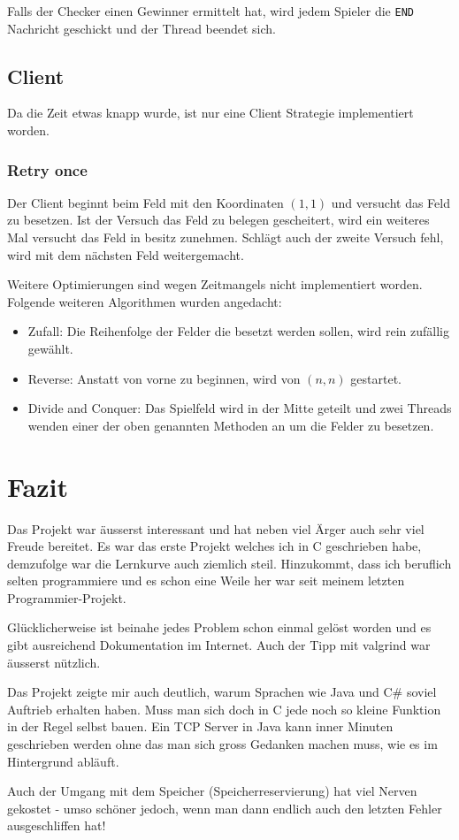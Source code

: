 Falls der Checker einen Gewinner ermittelt hat, wird jedem Spieler die \texttt{END} Nachricht geschickt und der Thread beendet sich.  

\section{Client}
Da die Zeit etwas knapp wurde, ist nur eine Client Strategie implementiert worden.

\subsection{Retry once}
Der Client beginnt beim Feld mit den Koordinaten $(1, 1)$ und versucht das Feld zu besetzen. Ist der Versuch das Feld zu belegen gescheitert, wird ein weiteres Mal versucht das Feld in besitz zunehmen. Schlägt auch der zweite Versuch fehl, wird mit dem nächsten Feld weitergemacht.

Weitere Optimierungen sind wegen Zeitmangels nicht implementiert worden. Folgende weiteren Algorithmen wurden angedacht:
\begin{itemize}
	\item Zufall: Die Reihenfolge der Felder die besetzt werden sollen, wird rein zufällig gewählt.
	\item Reverse: Anstatt von vorne zu beginnen, wird von $(n, n)$ gestartet.
	\item Divide and Conquer: Das Spielfeld wird in der Mitte geteilt und zwei Threads wenden einer der oben genannten Methoden an um die Felder zu besetzen.
\end{itemize}


\chapter{Fazit}
Das Projekt war äusserst interessant und hat neben viel Ärger auch sehr viel Freude bereitet. Es war das erste Projekt welches ich in C geschrieben habe, demzufolge war die Lernkurve auch ziemlich steil. Hinzukommt, dass ich beruflich selten programmiere und es schon eine Weile her war seit meinem letzten Programmier-Projekt.

Glücklicherweise ist beinahe jedes Problem schon einmal gelöst worden und es gibt ausreichend Dokumentation im Internet. Auch der Tipp mit valgrind war äusserst nützlich. 

Das Projekt zeigte mir auch deutlich, warum Sprachen wie Java und C\# soviel Auftrieb erhalten haben. Muss man sich doch in C jede noch so kleine Funktion in der Regel selbst bauen. Ein TCP Server in Java kann inner Minuten geschrieben werden ohne das man sich gross Gedanken machen muss, wie es im Hintergrund abläuft.

Auch der Umgang mit dem Speicher (Speicherreservierung) hat viel Nerven gekostet - umso schöner jedoch, wenn man dann endlich auch den letzten Fehler ausgeschliffen hat!